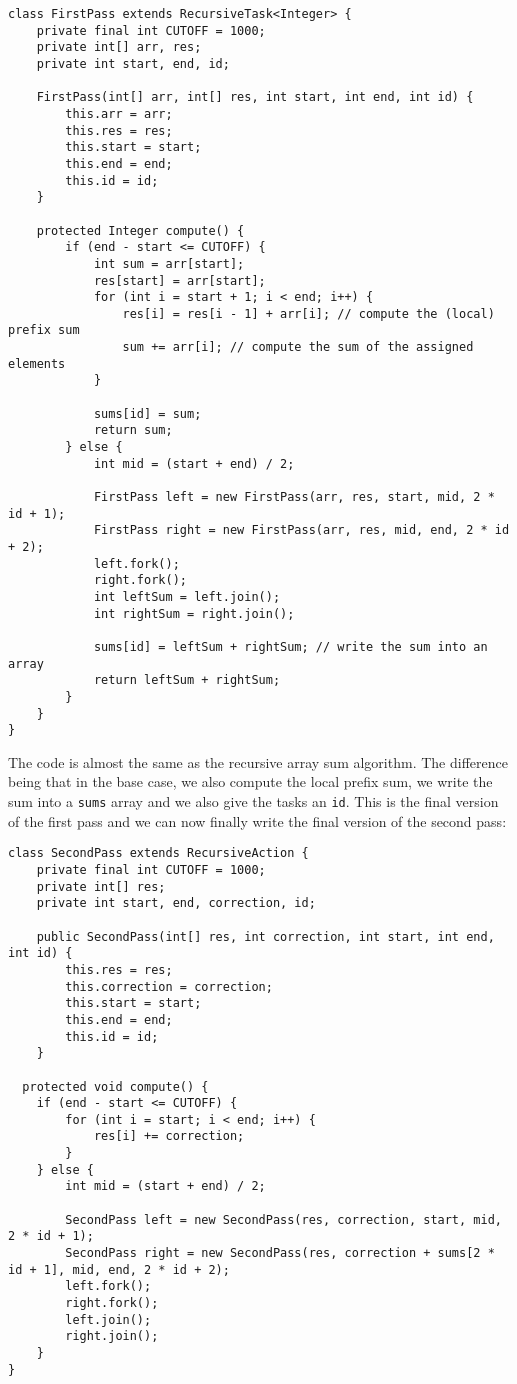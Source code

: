 \documentclass[main.tex]{subfiles}
\begin{document}
\begin{verbatim}
class FirstPass extends RecursiveTask<Integer> {
    private final int CUTOFF = 1000;
    private int[] arr, res;
    private int start, end, id;

    FirstPass(int[] arr, int[] res, int start, int end, int id) {
        this.arr = arr;
        this.res = res;
        this.start = start;
        this.end = end;
        this.id = id;
    }

    protected Integer compute() {
        if (end - start <= CUTOFF) {
            int sum = arr[start];
            res[start] = arr[start];
            for (int i = start + 1; i < end; i++) {
                res[i] = res[i - 1] + arr[i]; // compute the (local) prefix sum
                sum += arr[i]; // compute the sum of the assigned elements
            }

            sums[id] = sum;
            return sum;
        } else {
            int mid = (start + end) / 2;

            FirstPass left = new FirstPass(arr, res, start, mid, 2 * id + 1);
            FirstPass right = new FirstPass(arr, res, mid, end, 2 * id + 2);
            left.fork();
            right.fork();
            int leftSum = left.join();
            int rightSum = right.join();

            sums[id] = leftSum + rightSum; // write the sum into an array
            return leftSum + rightSum;
        }
    }
}
\end{verbatim}

\noindent The code is almost the same as the recursive array sum algorithm. The difference being that in the base case, we also compute the local prefix sum, we write the sum into a \texttt{sums} array and we also give the tasks an \texttt{id}. This is the final version of the first pass and we can now finally write the final version of the second pass:

\begin{verbatim}
class SecondPass extends RecursiveAction {
    private final int CUTOFF = 1000;
    private int[] res;
    private int start, end, correction, id;

    public SecondPass(int[] res, int correction, int start, int end, int id) {
        this.res = res;
        this.correction = correction;
        this.start = start;
        this.end = end;
        this.id = id;
    }

  protected void compute() {
    if (end - start <= CUTOFF) {
        for (int i = start; i < end; i++) {
            res[i] += correction;
        }
    } else {
        int mid = (start + end) / 2;

        SecondPass left = new SecondPass(res, correction, start, mid, 2 * id + 1);
        SecondPass right = new SecondPass(res, correction + sums[2 * id + 1], mid, end, 2 * id + 2);
        left.fork();
        right.fork();
        left.join();
        right.join();
    }
}
\end{verbatim}
\end{document}
